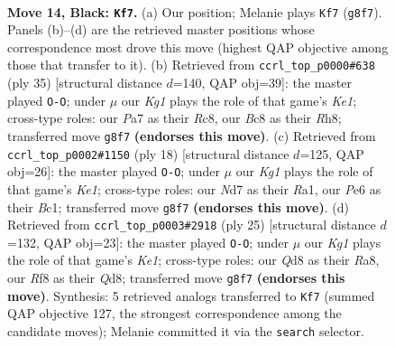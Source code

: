 \documentclass[11pt]{article}
\begin{document}
\clearpage

\begin{figure}[p]\centering
\begin{subfigure}{0.46\textwidth}\centering
\resizebox{\linewidth}{!}{%
\newchessgame
\chessboard[
  setfen={rnbq1rk1/pp1nb3/4p1p1/6P1/P2P4/2N2N2/1P3P2/R1BQKB1R b KQ - 0 14},
  showmover=false,
  pgfstyle=straightmove, color=movearrow, markmove={g8-f7}
]}
\caption{}
\end{subfigure}\hfill
\begin{subfigure}{0.46\textwidth}\centering
\resizebox{\linewidth}{!}{%
\newchessgame
\chessboard[
  setfen={2r1k2r/ppqbbppp/2n5/8/2NPP1n1/P4N2/1Q2B1PP/1RB1K2R b Kk - 6 18},
  showmover=false,
  pgfstyle=straightmove, color=movearrow, markmove={e8-g8}
]}
\caption{}
\end{subfigure}
\\[4pt]
\begin{subfigure}{0.46\textwidth}\centering
\resizebox{\linewidth}{!}{%
\newchessgame
\chessboard[
  setfen={r1bqkb1r/pp4pp/2n1pn2/3p4/3P4/3B4/PP1NNPPP/R1BQK2R w KQkq - 0 10},
  showmover=false,
  pgfstyle=straightmove, color=movearrow, markmove={e1-g1}
]}
\caption{}
\end{subfigure}\hfill
\begin{subfigure}{0.46\textwidth}\centering
\resizebox{\linewidth}{!}{%
\newchessgame
\chessboard[
  setfen={r2qk2r/pp2bppp/1n1p4/3Pn3/8/2N4P/PP2BPP1/R1BQK2R b KQkq - 2 13},
  showmover=false,
  pgfstyle=straightmove, color=movearrow, markmove={e8-g8}
]}
\caption{}
\end{subfigure}
\caption{\textbf{Move 14, Black: \texttt{Kf7}.} (a) Our position; Melanie plays \texttt{Kf7} (\texttt{g8f7}). Panels (b)--(d) are the retrieved master positions whose correspondence most drove this move (highest QAP objective among those that transfer to it). (b) Retrieved from \texttt{ccrl\_top\_p0000\#638} (ply 35) [structural distance $d$=140, QAP obj=39]: the master played \texttt{O-O}; under $\mu$ our \emph{Kg1} plays the role of that game's \emph{Ke1}; cross-type roles: our \emph{P}a7 as their \emph{R}c8, our \emph{B}c8 as their \emph{R}h8; transferred move \texttt{g8f7} \textbf{(endorses this move)}. (c) Retrieved from \texttt{ccrl\_top\_p0002\#1150} (ply 18) [structural distance $d$=125, QAP obj=26]: the master played \texttt{O-O}; under $\mu$ our \emph{Kg1} plays the role of that game's \emph{Ke1}; cross-type roles: our \emph{N}d7 as their \emph{R}a1, our \emph{P}e6 as their \emph{B}c1; transferred move \texttt{g8f7} \textbf{(endorses this move)}. (d) Retrieved from \texttt{ccrl\_top\_p0003\#2918} (ply 25) [structural distance $d$=132, QAP obj=23]: the master played \texttt{O-O}; under $\mu$ our \emph{Kg1} plays the role of that game's \emph{Ke1}; cross-type roles: our \emph{Q}d8 as their \emph{R}a8, our \emph{R}f8 as their \emph{Q}d8; transferred move \texttt{g8f7} \textbf{(endorses this move)}. Synthesis: 5 retrieved analogs transferred to \texttt{Kf7} (summed QAP objective 127, the strongest correspondence among the candidate moves); Melanie committed it via the \texttt{search} selector.}
\label{fig:thought-m27}
\end{figure}
\end{document}
